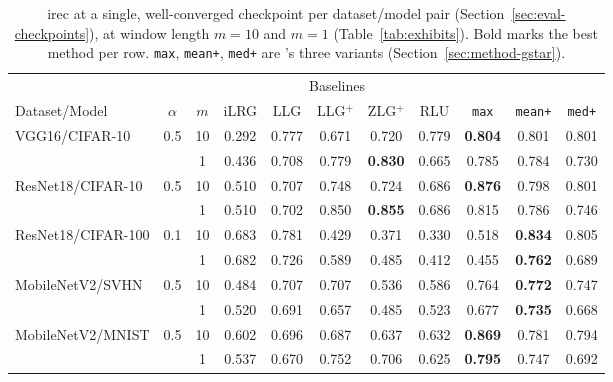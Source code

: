 \begin{table}[t]
\centering
\caption{irec at a single, well-converged checkpoint per dataset/model
pair (Section~\ref{sec:eval-checkpoints}), at window length $m=10$ and
$m=1$ (Table~\ref{tab:exhibits}). Bold marks the best method per row.
\texttt{max}, \texttt{mean+}, \texttt{med+} are \ourmethod{}'s three
variants (Section~\ref{sec:method-gstar}).}
\label{tab:rq2-main}
\footnotesize
\setlength{\tabcolsep}{3pt}
\begin{tabular}{@{}l c c c c c c c c c c@{}}
\toprule
& & & \multicolumn{5}{c}{Baselines} & \multicolumn{3}{c}{\ourmethod{}} \\
\cmidrule(lr){4-8}\cmidrule(lr){9-11}
Dataset/Model & $\alpha$ & $m$ & iLRG & LLG & LLG$^+$ & ZLG$^+$ & RLU & \texttt{max} & \texttt{mean+} & \texttt{med+} \\
\midrule
\multirow{2}{*}{VGG16/CIFAR-10} & \multirow{2}{*}{0.5}
 & 10 & 0.292 & 0.777 & 0.671 & 0.720 & 0.779 & \textbf{0.804} & 0.801 & 0.801 \\
 & & 1 & 0.436 & 0.708 & 0.779 & \textbf{0.830} & 0.665 & 0.785 & 0.784 & 0.730 \\
\multirow{2}{*}{ResNet18/CIFAR-10} & \multirow{2}{*}{0.5}
 & 10 & 0.510 & 0.707 & 0.748 & 0.724 & 0.686 & \textbf{0.876} & 0.798 & 0.801 \\
 & & 1 & 0.510 & 0.702 & 0.850 & \textbf{0.855} & 0.686 & 0.815 & 0.786 & 0.746 \\
\multirow{2}{*}{ResNet18/CIFAR-100} & \multirow{2}{*}{0.1}
 & 10 & 0.683 & 0.781 & 0.429 & 0.371 & 0.330 & 0.518 & \textbf{0.834} & 0.805 \\
 & & 1 & 0.682 & 0.726 & 0.589 & 0.485 & 0.412 & 0.455 & \textbf{0.762} & 0.689 \\
\multirow{2}{*}{MobileNetV2/SVHN} & \multirow{2}{*}{0.5}
 & 10 & 0.484 & 0.707 & 0.707 & 0.536 & 0.586 & 0.764 & \textbf{0.772} & 0.747 \\
 & & 1 & 0.520 & 0.691 & 0.657 & 0.485 & 0.523 & 0.677 & \textbf{0.735} & 0.668 \\
\multirow{2}{*}{MobileNetV2/MNIST} & \multirow{2}{*}{0.5}
 & 10 & 0.602 & 0.696 & 0.687 & 0.637 & 0.632 & \textbf{0.869} & 0.781 & 0.794 \\
 & & 1 & 0.537 & 0.670 & 0.752 & 0.706 & 0.625 & \textbf{0.795} & 0.747 & 0.692 \\
\bottomrule
\end{tabular}
\end{table}

